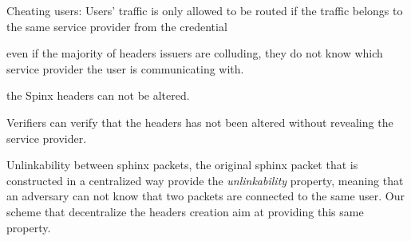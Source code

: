 \begin{objectives}
%
        \item Cheating users: Users' traffic is only allowed to be routed
if the traffic belongs to the same service provider from the credential
%
        \item even if the majority of headers issuers are colluding, they
do not know which service provider the user is communicating with.
%
        \item the Spinx headers can not be altered.
%
        \item Verifiers can verify that the headers has not been altered
without revealing the service provider.
%
        \item Unlinkability between  sphinx packets, the original sphinx
packet that is constructed in a centralized way provide the
\textit{unlinkability} property, meaning that an adversary can not know
that two packets are connected to the same user. Our scheme that
decentralize the headers creation aim at providing this same property.
%
\end{objectives}


